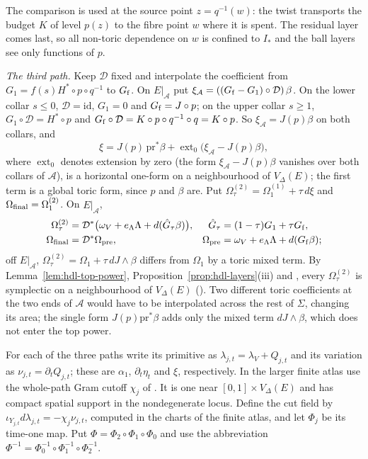 The comparison is used at the source point $z=q^{-1}(w)$: the twist transports the budget $K$ of level $p(z)$ to the
fibre point $w$ where it is spent. The residual layer comes last, so all non-toric dependence on $w$ is confined to
$I_*$ and the ball layers see only functions of $p$.

\emph{The third path.} Keep $\mathcal D$ fixed and interpolate the coefficient from $G_1=f(s)H^*\circ p\circ q^{-1}$ to
$G_{\rm f}$. On $E|_{\mathcal A}$ put $\xi_{\mathcal A}=((G_{\rm f}-G_1)\circ\mathcal D)\,\beta$. On the lower collar
$s\le0$, $\mathcal D=\mathrm{id}$, $G_1=0$ and $G_{\rm f}=J\circ p$; on the upper collar $s\ge1$,
$G_1\circ\mathcal D=H^*\circ p$ and $G_{\rm f}\circ\mathcal D=K\circ p\circ q^{-1}\circ q=K\circ p$. So
$\xi_{\mathcal A}=J(p)\beta$ on both collars, and
\begin{equation}\label{eq:hdl-xi}
 \xi=J(p)\,\mathrm{pr}^*\beta+\operatorname{ext}_0\big(\xi_{\mathcal A}-J(p)\beta\big),
\end{equation}
where $\operatorname{ext}_0$ denotes extension by zero (the form $\xi_{\mathcal A}-J(p)\beta$ vanishes over both collars of
$\mathcal A$), is a horizontal one-form on a neighbourhood of $V_\Delta(E)$; the first term is a global toric form,
since $p$ and $\beta$ are. Put $\Omega^{(2)}_\tau=\Omega^{(1)}_1+\tau\,d\xi$ and $\Omega_{\rm final}=\Omega^{(2)}_1$. On
$E|_{\mathcal A}$,
\begin{equation}\label{eq:hdl-final}
\begin{aligned}
 \Omega^{(2)}_\tau&=\mathcal D^*\big(\omega_V+e_\Lambda\Lambda+d(\hat G_\tau\beta)\big),&\hat G_\tau&=(1-\tau)G_1+\tau G_{\rm f},\\
 \Omega_{\rm final}&=\mathcal D^*\Omega_{\rm pre},&\Omega_{\rm pre}&=\omega_V+e_\Lambda\Lambda+d(G_{\rm f}\beta);
\end{aligned}
\end{equation}
off $E|_{\mathcal A}$, $\Omega^{(2)}_\tau=\Omega_1+\tau\,dJ\wedge\beta$ differs from $\Omega_1$ by a toric mixed term. By
Lemma~\ref{lem:hdl-top-power}, Proposition~\ref{prop:hdl-layers}(iii) and , every $\Omega^{(2)}_\tau$ is
symplectic on a neighbourhood of $V_\Delta(E)$ (). Two different toric coefficients at the two
ends of $\mathcal A$ would have to be interpolated across the rest of $\Sigma$, changing its area; the single form
$J(p)\mathrm{pr}^*\beta$ adds only the mixed term $dJ\wedge\beta$, which does not enter the top power.

For each of the three paths write its primitive as $\lambda_{j,t}=\lambda_V+Q_{j,t}$ and its variation
as $\nu_{j,t}=\partial_tQ_{j,t}$; these are $\alpha_1$, $\partial_t\eta_t$ and $\xi$, respectively.
In the larger finite atlas use the whole-path Gram cutoff $\chi_j$ of
. It is one near $[0,1]\times V_\Delta(E)$ and has compact spatial
support in the nondegenerate locus. Define the cut field by
$\iota_{Y_{j,t}}d\lambda_{j,t}=-\chi_j\nu_{j,t}$, computed in the charts of the finite atlas, and let $\Phi_j$ be
its time-one map. Put $\Phi=\Phi_2\circ\Phi_1\circ\Phi_0$ and use the abbreviation
$\Phi^{-1}=\Phi_0^{-1}\circ\Phi_1^{-1}\circ\Phi_2^{-1}$.

